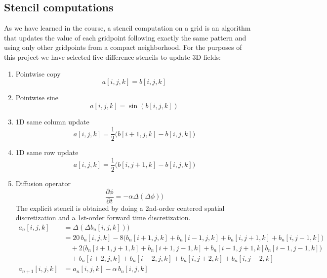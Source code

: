 \documentclass[12pt]{article}
\begin{document}
\subsection{Stencil computations}

As we have learned in the course, a stencil computation on a grid is an algorithm that updates the value of each gridpoint following exactly the same pattern and using only other gridpoints from a compact neighborhood. For the purposes of this project we have selected five difference stencils to update 3D fields:

\begin{enumerate}
    \item Pointwise copy
    \begin{equation*}
        a[i,j,k] = b[i,j,k]
    \end{equation*}
    \item Pointwise sine
    \begin{equation*}
        a[i,j,k] = \sin(b[i,j,k])
    \end{equation*}
    \item 1D same column update
    \begin{equation*}
        a[i,j,k] = \frac{1}{2}\Big(b[i+1,j,k] - b[i,j,k]\Big)
    \end{equation*}
    \item 1D same row update
    \begin{equation*}
        a[i,j,k] = \frac{1}{2}\Big(b[i,j+1,k] - b[i,j,k]\Big)
    \end{equation*}
    \item Diffusion operator
    \begin{equation*}
        \frac{\partial\phi}{\partial t} = -\alpha \Delta(\Delta\phi))
    \end{equation*}
    The explicit stencil is obtained by doing a 2nd-order centered spatial discretization and a 1st-order forward time discretization.
    \begin{align*}
    a_n[i,j,k] &= \Delta(\Delta b_n[i,j,k])) \\
    &= 20\, b_n[i,j,k] - 8 \Big(b_n[i+1,j,k] + b_n[i-1,j,k] + b_n[i,j+1,k] + b_n[i,j-1,k]\Big)\\
    &\quad + 2\Big(b_n[i+1,j+1,k] + b_n[i+1,j-1,k] + b_n[i-1,j+1,k] b_n[i-1,j-1,k]\Big) \\
    &\quad + b_n[i+2,j,k] + b_n[i-2,j,k] + b_n[i,j+2,k] + b_n[i,j-2,k]\\
    a_{n+1}[i,j,k] &= a_n[i,j,k] - \alpha\, b_n[i,j,k]
    \end{align*}
\end{enumerate}
\end{document}
